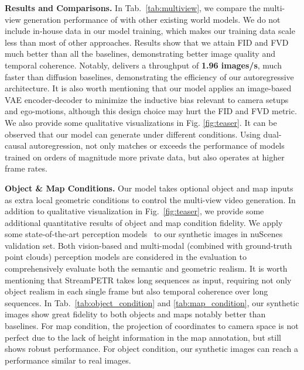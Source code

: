 \noindent\textbf{Results and Comparisons.} In Tab.~\ref{tab:multiview}, we compare the multi-view generation performance of \ourmethod{} with other existing world models. We do not include in-house data in our model training, which makes our training data scale less than most of other approaches. Results show that we attain FID and FVD much better than all the baselines, demonstrating better image quality and temporal coherence. Notably, \ourmethod{} delivers a throughput of \textbf{1.96 images/s}, much faster than diffusion baselines, demonstrating the efficiency of our autoregressive architecture. It is also worth mentioning that our model applies an image-based VAE encoder-decoder to minimize the inductive bias relevant to camera setups and ego-motions, although this design choice may hurt the FID and FVD metric. We also provide some qualitative visualizations in Fig. \ref{fig:teaser}. It can be observed that our model can generate under different conditions. Using dual-causal autoregression, \ourmethod{} not only matches or exceeds the performance of models trained on orders of magnitude more private data, but also operates at higher frame rates. 


\noindent\textbf{Object \& Map Conditions.} Our model takes optional object and map inputs as extra local geometric conditions to control the multi-view video generation. In addition to qualitative visualization in Fig.~\ref{fig:teaser}, we provide some additional quantitative results of object and map condition fidelity. We apply some state-of-the-art perception models~\cite{wang2023exploring,xie2023sparsefusion,liu2022bevfusion} to our synthetic images in nuScenes validation set. Both vision-based and multi-modal (combined with ground-truth point clouds) perception models are considered in the evaluation to comprehensively evaluate both the semantic and geometric realism. It is worth mentioning that StreamPETR takes long sequences as input, requiring  not only object realism in each single frame but also temporal coherence over long sequences. In Tab.~\ref{tab:object_condition} and \ref{tab:map_condition}, our synthetic images show great fidelity to both objects and maps notably better than baselines. For map condition, the projection of coordinates to camera space is not perfect due to the lack of height information in the map annotation, but \ourmethod{} still shows robust performance. For object condition, our synthetic images can reach a performance similar to real images.

